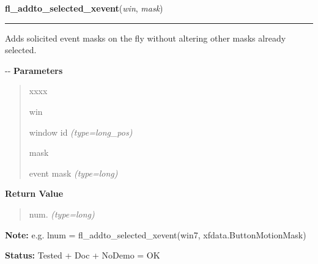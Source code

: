 \hspace{.8\funcindent}\begin{boxedminipage}{\funcwidth}

    \raggedright \textbf{fl\_addto\_selected\_xevent}(\textit{win}, \textit{mask})

    \vspace{-1.5ex}

    \rule{\textwidth}{0.5\fboxrule}
\setlength{\parskip}{2ex}

Adds solicited event masks on the fly without altering other masks
already selected.

-{}-
\setlength{\parskip}{1ex}
      \textbf{Parameters}
      \vspace{-1ex}

      \begin{quote}
        \begin{Ventry}{xxxx}

          \item[win]


window id
            {\it (type=long\_pos)}

          \item[mask]


event mask
            {\it (type=long)}

        \end{Ventry}

      \end{quote}

      \textbf{Return Value}
    \vspace{-1ex}

      \begin{quote}

num.
      {\it (type=long)}

      \end{quote}

\textbf{Note:} 
e.g. lnum = fl\_addto\_selected\_xevent(win7, xfdata.ButtonMotionMask)


\textbf{Status:} 
Tested + Doc + NoDemo = OK


    \end{boxedminipage}

    \label{xformslib:flxbasic:fl_remove_selected_xevent}

    \vspace{0.5ex}

